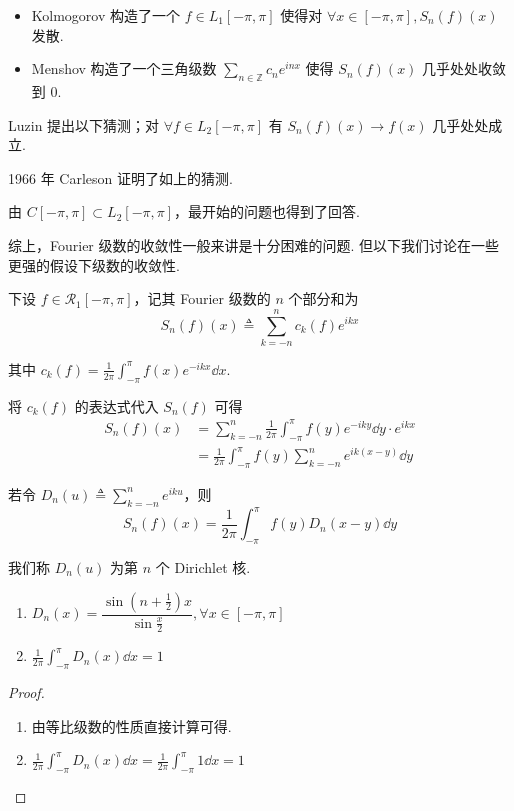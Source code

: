 \begin{itemize}
    \item Kolmogorov  构造了一个 $f\in L_1[-\pi,\pi]$ 使得对 $\forall x\in[-\pi,\pi],S_n(f)(x)$ 发散.
    
    \item Menshov 构造了一个三角级数 $\displaystyle\sum_{n\in\mathbb{Z}}c_ne^{inx}$ 使得 $S_n(f)(x)$ 几乎处处收敛到 $0$.
\end{itemize}

Luzin 提出以下猜测；对 $\forall f\in L_2[-\pi,\pi]$ 有 $S_n(f)(x)\to f(x)$ 几乎处处成立.

1966 年 Carleson 证明了如上的猜测.

由 $C[-\pi,\pi]\subset L_2[-\pi,\pi]$，最开始的问题也得到了回答.

综上，Fourier 级数的收敛性一般来讲是十分困难的问题. 但以下我们讨论在一些更强的假设下级数的收敛性.


下设 $f\in \mathcal{R}_1[-\pi,\pi]$，记其 Fourier 级数的 $n$ 个部分和为
$$
S_n(f)(x)\triangleq\sum_{k=-n}^nc_k(f)e^{ikx}
$$

其中 $c_k(f)=\displaystyle\frac{1}{2\pi}\int_{-\pi}^{\pi}f(x)e^{-ikx}\dd x$.

将 $c_k(f)$ 的表达式代入 $S_n(f)$ 可得
$$
\begin{aligned}
    S_n(f)(x)&=\sum_{k=-n}^n\frac{1}{2\pi}\int_{-\pi}^{\pi}f(y)e^{-iky}\dd y\cdot e^{ikx}\\
    &=\frac{1}{2\pi}\int_{-\pi}^{\pi}f(y)\sum_{k=-n}^ne^{ik(x-y)}\dd y
\end{aligned}
$$

若令 $D_n(u)\triangleq\displaystyle\sum_{k=-n}^ne^{iku}$，则
$$
S_n(f)(x)=\frac{1}{2\pi}\int_{-\pi}^{\pi}f(y)D_n(x-y)\dd y
$$

我们称 $D_n(u)$ 为第 $n$ 个 Dirichlet 核.

\begin{property}
    \begin{enumerate}
        \item $D_n(x)=\dfrac{\sin\left(n+\frac{1}{2}\right)x}{\sin\frac{x}{2}},\forall x\in[-\pi,\pi]$
        
        \item $\displaystyle\frac{1}{2\pi}\int_{-\pi}^{\pi}D_n(x)\dd x=1$
    \end{enumerate}
\end{property}
\begin{proof}
    \begin{enumerate}
        \item 由等比级数的性质直接计算可得.
        
        \item $\displaystyle\frac{1}{2\pi}\int_{-\pi}^{\pi}D_n(x)\dd x=\frac{1}{2\pi}\int_{-\pi}^{\pi}1\dd x=1$
    \end{enumerate}
\end{proof}

